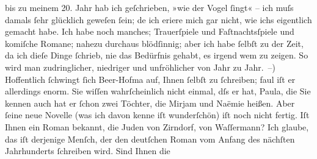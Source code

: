 \begin{ledgroupsized}[t]{13cm}
                    bis zu meinem 20. Jahr hab ich geſchrieben, »wie der Vogel ſingt« – ich muſs
                    damals ſehr glücklich geweſen ſein; de{\geminationn} ich eri{\geminationn}ere mich gar nicht, wie ichs eigentlich gemacht
                    habe. Ich habe noch manches; Trauerſpiele und Faſtnachtsſpiele und {\pb}komiſche Romane; nahezu durchaus blödſinnig;
                    aber ich habe ſelbſt zu der Zeit, da ich dieſe Dinge ſchrieb, nie das Bedürfnis
                    gehabt, es irgend wem zu zeigen. So wird man zudringlicher, niedriger und
                    unfröhlicher von Jahr zu Jahr. –)\pend
           \pstart
           Hoffentlich ſchwingt ſich Beer-Hofma{\geminationn} auf, Ihnen ſelbſt zu ſchreiben; faul iſt er allerdings enorm. Sie wiſſen
                    wahrſcheinlich nicht einmal, dſs er \label{K_L00880_3v}\label{K_L00880_3h} hat, Paula, die Sie kennen {\pb}auch hat er
                    ſchon zwei Töchter, die Mirjam und Naëmie heißen. Aber ſeine neue Novelle (was ich davon kenne
                    iſt wunderſchön) iſt noch nicht fertig.\pend
           \pstart
           Iſt Ihnen ein Roman bekannt, die Juden von
                        Zirndorf, von Waſſermann? Ich
                    glaube, das iſt derjenige Menſch, der den \introOben{}deutſchen\introOben{}
                    Roman vom Anfang des nächſten Jahrhunderts ſchreiben wird. Sind Ihnen die

\end{ledgroupsized}
